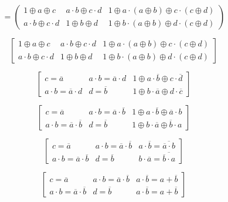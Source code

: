 \begin{enumerate}
\begin{enumerate}
\begin{enumerate}
\begin{enumerate}
        \[{} = \begin{pmatrix}
        {1 \oplus a \oplus c} & {{a \cdot b} \oplus {c \cdot d}} & {1 \oplus {a \cdot {({a \oplus b})}} \oplus {c \cdot {({c \oplus d})}}} \\
        {{a \cdot b} \oplus {c \cdot d}} & {1 \oplus b \oplus d} & {1 \oplus {b \cdot {({a \oplus b})}} \oplus {d \cdot {({c \oplus d})}}}
        \end{pmatrix}\]

        \[\begin{bmatrix}
        {1 \oplus a \oplus c} & {{a \cdot b} \oplus {c \cdot d}} & {1 \oplus {a \cdot {({a \oplus b})}} \oplus {c \cdot {({c \oplus d})}}} \\
        {{a \cdot b} \oplus {c \cdot d}} & {1 \oplus b \oplus d} & {1 \oplus {b \cdot {({a \oplus b})}} \oplus {d \cdot {({c \oplus d})}}}
        \end{bmatrix}\]

        \[\begin{bmatrix}
        {c = \overline{a}} & {{a \cdot b} = {\overline{a} \cdot d}} & {1 \oplus {a \cdot \overline{b}} \oplus {c \cdot \overline{d}}} \\
        {{a \cdot b} = {\overline{a} \cdot d}} & {d = \overline{b}} & {1 \oplus {b \cdot \overline{a}} \oplus {d \cdot \overline{c}}}
        \end{bmatrix}\]

        \[\begin{bmatrix}
        {c = \overline{a}} & {{a \cdot b} = {\overline{a} \cdot \overline{b}}} & {1 \oplus {a \cdot \overline{b}} \oplus {\overline{a} \cdot b}} \\
        {{a \cdot b} = {\overline{a} \cdot \overline{b}}} & {d = \overline{b}} & {1 \oplus {b \cdot \overline{a}} \oplus {\overline{b} \cdot a}}
        \end{bmatrix}\]

        \[\begin{bmatrix}
        {c = \overline{a}} & {{a \cdot b} = {\overline{a} \cdot \overline{b}}} & {{a \cdot \overline{b}} = \overline{\overline{a}\cdot b}} \\
        {{a \cdot b} = {\overline{a} \cdot \overline{b}}} & {d = \overline{b}} & {{b \cdot \overline{a}} = \overline{\overline{b}\cdot a}}
        \end{bmatrix}\]

        \[\begin{bmatrix}
        {c = \overline{a}} & {{a \cdot b} = {\overline{a} \cdot \overline{b}}} & {{a \cdot \overline{b}} = {a + \overline{b}}} \\
        {{a \cdot b} = {\overline{a} \cdot \overline{b}}} & {d = \overline{b}} & {{a \cdot \overline{b}} = {a + \overline{b}}}
        \end{bmatrix}\]


\end{enumerate}
\end{enumerate}
\end{enumerate}
\end{enumerate}
